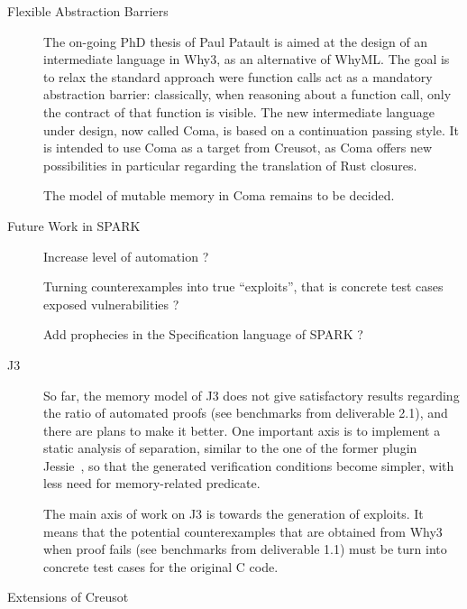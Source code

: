 \documentclass[a4paper,11pt]{article}
\begin{document}
\begin{description}
\item[Flexible Abstraction Barriers]

  The on-going PhD thesis of Paul Patault is aimed at the design of an
  intermediate language in Why3, as an alternative of WhyML. The goal is to
  relax the standard approach were function calls act as a mandatory abstraction
  barrier: classically, when reasoning about a function call, only the contract
  of that function is visible. The new intermediate language under design, now
  called Coma, is based on a continuation passing style. It is intended to use
  Coma as a target from Creusot, as Coma offers new possibilities in particular
  regarding the translation of Rust closures.

  The model of mutable memory in Coma remains to be decided.

\item[Future Work in SPARK]


  Increase level of automation ?

  Turning counterexamples into true ``exploits'', that is concrete test cases
  exposed vulnerabilities ?

  Add prophecies in the Specification language of SPARK ?

\item[J3]


  So far, the memory model of J3 does not give satisfactory results regarding
  the ratio of automated proofs (see benchmarks from deliverable 2.1), and
  there are plans to make it better. One important axis is to implement a static
  analysis of separation, similar to the one of the former plugin
  Jessie~\cite{hubert2008these,hubert07hav}, so that the generated verification
  conditions become simpler, with less need for memory-related predicate.

  The main axis of work on J3 is towards the generation of exploits. It means
  that the potential counterexamples that are obtained from Why3 when proof
  fails (see benchmarks from deliverable 1.1) must be turn into concrete test
  cases for the original C code.

\item[Extensions of Creusot]


\end{description}
\end{document}
